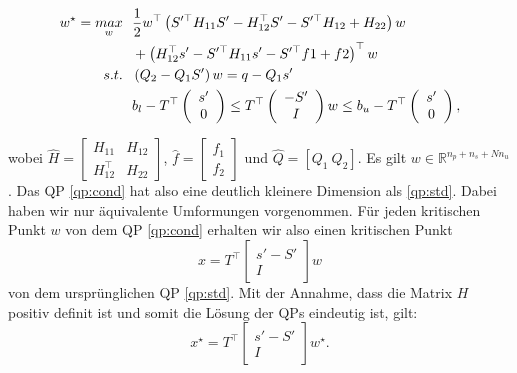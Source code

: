 \begin{align} \label{qp:cond}
w^\star=\underset{w}{max} \ \ 	& \frac{1}{2}	w^\top \left(S'^\top H_{11}S'-H_{12}^\top S'-S'^\top H_{12}+H_{22}\right) w \\
						&+\left(H_{12}^\top s'-S'^\top H_{11}s'-S'^\top f1+f2\right)^\top w \notag \\
s.t. \ \					& \left(Q_2-Q_1S' \right)w =q-Q_1s' \notag \\
						& b_l-T^\top \left( \begin{array}{c} s' \\ 0	\end{array}\right)  						\leq T^\top \left( \begin{array}{c} -S' \\ I	\end{array}	 \right)w
						\leq b_u-T^\top \left( \begin{array}{c} s' \\ 0	\end{array}	\right), \notag
\end{align}

wobei $\hat{H}=\left[ \begin{array}{cc} H_{11}&H_{12}\\ H_{12}^\top & H_{22}\end{array} \right]$, $\hat{f}=\left[ \begin{array}{c} f_1 \\ f_2\end{array} \right]$ und $\hat{Q}= [Q_1 \ Q_2]$. Es gilt $w \in \mathbb{R}^{n_p+n_s+Nn_u}$. Das QP \ref{qp:cond} hat also eine deutlich kleinere Dimension als \ref{qp:std}. Dabei haben wir nur äquivalente Umformungen vorgenommen. Für jeden kritischen Punkt $w$ von dem QP \ref{qp:cond} erhalten wir also einen kritischen Punkt $$x=T^\top \left[\begin{array}{c} s'-S' \\ I \end{array}\right] w$$ von dem ursprünglichen QP \ref{qp:std}. Mit der Annahme, dass die Matrix $H$ positiv definit ist und somit die Lösung der QPs eindeutig ist, gilt: $$x^\star=T^\top \left[\begin{array}{c} s'-S' \\ I \end{array}\right] w^\star.$$